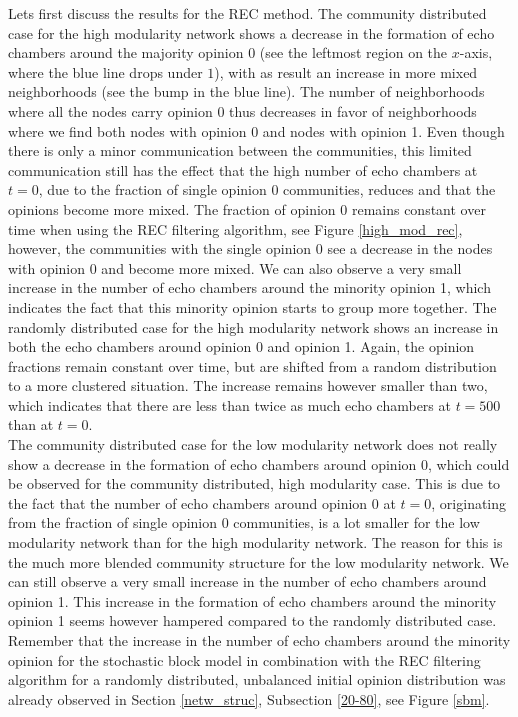 \documentclass[11 pt , letterpaper , twoside , openright]{book}
\begin{document}
\newline
Lets first discuss the results for the REC method. The community distributed case for the high modularity network shows a decrease in the formation of echo chambers around the majority opinion 0 (see the leftmost region on the $x$-axis, where the blue line drops under $1$), with as result an increase in more mixed neighborhoods (see the bump in the blue line). The number of neighborhoods where all the nodes carry opinion 0 thus decreases in favor of neighborhoods where we find both nodes with opinion 0 and nodes with opinion 1. Even though there is only a minor communication between the communities, this limited communication still has the effect that the high number of echo chambers at $t=0$, due to the fraction of single opinion 0 communities, reduces and that the opinions become more mixed. The fraction of opinion 0 remains constant over time when using the REC filtering algorithm, see Figure \ref{high_mod_rec}, however, the communities with the single opinion 0 see a decrease in the nodes with opinion 0 and become more mixed. We can also observe a very small increase in the number of echo chambers around the minority opinion 1, which indicates the fact that this minority opinion starts to group more together. The randomly distributed case for the high modularity network shows an increase in both the echo chambers around opinion 0 and opinion 1. Again, the opinion fractions remain constant over time, but are shifted from a random distribution to a more clustered situation. The increase remains however smaller than two, which indicates that there are less than twice as much echo chambers at $t=500$ than at $t=0$.\\
The community distributed case for the low modularity network does not really show a decrease in the formation of echo chambers around opinion 0, which could be observed for the community distributed, high modularity case. This is due to the fact that the number of echo chambers around opinion 0 at $t=0$, originating from the fraction of single opinion 0 communities, is a lot smaller for the low modularity network than for the high modularity network. The reason for this is the much more blended community structure for the low modularity network. We can still observe a very small increase in the number of echo chambers around opinion 1. This increase in the formation of echo chambers around the minority opinion 1 seems however hampered compared to the randomly distributed case. Remember that the increase in the number of echo chambers around the minority opinion for the stochastic block model in combination with the REC filtering algorithm for a randomly distributed, unbalanced initial opinion distribution was already observed in Section \ref{netw_struc}, Subsection \ref{20-80}, see Figure \ref{sbm}. \\
\end{document}
